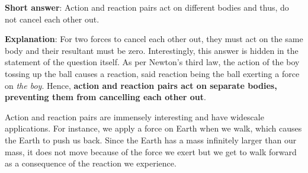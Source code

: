 \textbf{Short answer}: Action and reaction pairs act on different bodies and thus, do not cancel each other out.

\textbf{Explanation}: For two forces to cancel each other out, they must act on the same body and their resultant must be zero. Interestingly, this answer is hidden in the statement of the question itself. As per Newton's third law, the action of the boy tossing up the ball causes a reaction, said reaction being the ball exerting a force on \textit{the boy}. Hence, \textbf{action and reaction pairs act on separate bodies, preventing them from cancelling each other out}.

Action and reaction pairs are immensely interesting and have widescale applications. For instance, we apply a force on Earth when we walk, which causes the Earth to push us back. Since the Earth has a mass infinitely larger than our mass, it does not move because of the force we exert but we get to walk forward as a consequence of the reaction we experience.
